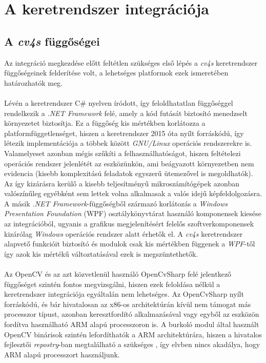 \chapter{A keretrendszer integrációja} \label{integracio}

\section{A \emph{cv4s} függőségei}

Az integráció megkezdése előtt feltétlen szükséges első lépés a \emph{cv4s} keretrendszer függőségeinek felderítése volt, a lehetséges platformok ezek ismeretében határozhatók meg. \\
\\
Lévén a keretrendszer C\# nyelven íródott, így feloldhatatlan függőséggel rendelkezik a \textit{.NET Framework} felé, amely a kód futását biztosító menedzselt környezetet biztosítja. Ez a függőség kis mértékben korlátozza a platformfüggetlenséget, hiszen a keretrendszer 2015 óta nyílt forráskódú, így létezik implementációja a többek között \emph{GNU/Linux} operációs rendszerekre is. Valamelyeset azonban mégis szűkíti a felhasználhatóságot, hiszen feltételezi operációs rendszer jelenlétét az eszközünkön, ami beágyazott környezetben nem evidencia (kisebb komplexitású feladatok egyszerű ütemezővel is megoldhatók). Az így kizárásra kerülő a kisebb teljesítményű mikroszámítógépek azonban valószínűleg egyébként sem lettek volna alkalmasak a valós idejű képfeldolgozásra. \\
A másik \emph{.NET Framework}-függőségből származó korlátozás a \textit{Windows Presentation Foundation} (WPF) osztálykönyvtárat használó komponensek kiesése az integrációból, ugyanis a grafikus megjelenítésért felelős szoftverkomponensek kizárólag \textit{Windows} operációs rendszer alatt érhetők el. A \emph{cv4s} keretrendszer alapvető funkcióit biztosító  és  modulok csak kis mértékben függenek a \emph{WPF}-től így azok kis mértékű változtatásával ezek is megszüntethetők.\\
\\
Az OpenCV és az azt közvetlenül használó OpenCvSharp felé jelentkező függőséget szintén fontos megvizsgálni, hiszen ezek feloldása nélkül a keretrendszer integrációja egyáltalán nem lehetséges. Az OpenCvSharp nyílt forráskódú, és bár hivatalosan az x86-os architektúrán kívül nem támogat más processzor típust, azonban keresztfordító alkalmazásával vagy egyből az eszközön fordítva használható ARM alapú processzoron is. A burkoló modul által használt OpenCV binárisok szintén lefordíthatók a ARM architektúrára, hiszen a hivatalos fejlesztői \textit{repostry}-ban megtalálható a szükséges , így elvben nincs akadálya, hogy ARM alapú processzort használjunk. \\

